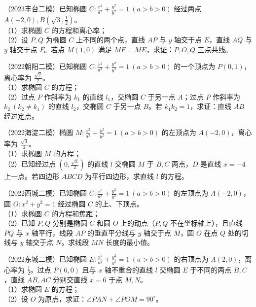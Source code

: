 \begin{example} %
（2023丰台二模）已知椭圆 $C:\frac{x^2}{a^2}+\frac{y^2}{b^2}=1\ (a>b>0)$ 经过两点 $A(-2,0),B\left(\sqrt{3},\frac{1}{2}\right)$。\\
（1）求椭圆 $C$ 的方程和离心率；\\
（2）设 $P,Q$ 为椭圆 $C$ 上不同的两个点，直线 $AP$ 与 $y$ 轴交于点 $E$，直线 $AQ$ 与 $y$ 轴交于点 $F$。若点 $M(1,0)$ 满足 $MF\perp ME$，求证：$P,O,Q$ 三点共线。
\end{example}

\begin{example} %
（2022朝阳二模）已知椭圆 $C:\frac{x^2}{a^2}+\frac{y^2}{b^2}=1\ (a>b>0)$ 的一个顶点为 $P(0,1)$，离心率为 $\frac{\sqrt{2}}{2}$。\\
（1）求椭圆 $C$ 的方程；\\
（2）过点 $P$ 作斜率为 $k_1$ 的直线 $l_1$，交椭圆 $C$ 于另一点 $A$；过点 $P$ 作斜率为 $k_2\ (k_2\neq k_1)$ 的直线 $l_2$，交椭圆 $C$ 于另一点 $B$。若 $k_1k_2=1$，求证：直线 $AB$ 经过定点。
\end{example}

\begin{example} %
（2022海淀二模）椭圆 $M:\frac{x^2}{a^2}+\frac{y^2}{b^2}=1\ (a>b>0)$ 的左顶点为 $A(-2,0)$，离心率为 $\frac{\sqrt{3}}{2}$。\\
（1）求椭圆 $M$ 的方程；\\
（2）已知经过点 $\left(0,\frac{\sqrt{3}}{2}\right)$ 的直线 $l$ 交椭圆 $M$ 于 $B,C$ 两点，$D$ 是直线 $x=-4$ 上一点。若四边形 $ABCD$ 为平行四边形，求直线 $l$ 的方程。
\end{example}

\begin{example} %
（2022西城二模）已知椭圆 $C:\frac{x^2}{a^2}+\frac{y^2}{b^2}=1\ (a>b>0)$ 的左顶点为 $A(-2,0)$，圆 $O:x^2+y^2=1$ 经过椭圆 $C$ 的上、下顶点。\\
（1）求椭圆 $C$ 的方程和焦距；\\
（2）已知 $P,Q$ 分别是椭圆 $C$ 和圆 $O$ 上的动点（$P,Q$ 不在坐标轴上），且直线 $PQ$ 与 $x$ 轴平行，线段 $AP$ 的垂直平分线与 $y$ 轴交于点 $M$，圆 $O$ 在点 $Q$ 处的切线与 $y$ 轴交于点 $N$。求线段 $MN$ 长度的最小值。
\end{example}

\begin{example} %
（2022东城二模）已知椭圆 $E:\frac{x^2}{a^2}+\frac{y^2}{b^2}=1\ (a>b>0)$ 的右顶点为 $A(2,0)$，离心率为 $\frac{1}{2}$。过点 $P(6,0)$ 且与 $x$ 轴不重合的直线 $l$ 交椭圆 $E$ 于不同的两点 $B,C$，直线 $AB,AC$ 分别交直线 $x=6$ 于点 $M,N$。\\
（1）求椭圆 $E$ 的方程；\\
（2）设 $O$ 为原点，求证：$\angle PAN+\angle POM=90^\circ$。
\end{example}

